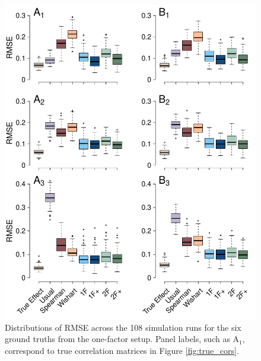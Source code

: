 \documentclass[man, 12pt]{apa7} %
\begin{document}
\begin{figure}[htbp]
    \centering  
    \includegraphics[width=\linewidth, height=1.1\linewidth, keepaspectratio]{_figs/rmse-res1.pdf}
    \caption{Distributions of RMSE across the 108 simulation runs for the six ground truths from the one-factor setup. Panel labels, such as A$_1$, correspond to true correlation matrices in Figure \ref{fig:true_cors}.}  
    \label{fig:rmse-res1}
\end{figure}
\end{document}
